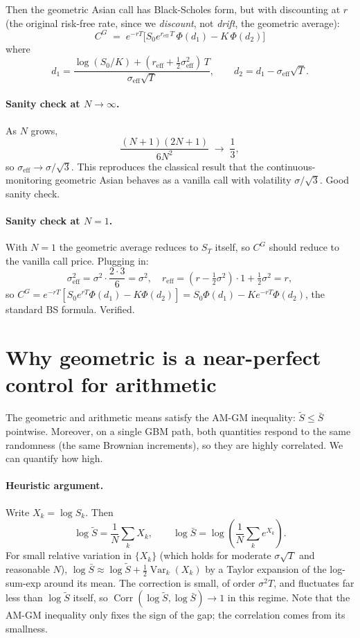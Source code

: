 \documentclass[11pt,a4paper]{article}
\theoremstyle{plain}
\theoremstyle{definition}
\theoremstyle{remark}
\newcommand{\Var}{\operatorname{Var}}
\newcommand{\Corr}{\operatorname{Corr}}
\begin{document}
Then the geometric Asian call has Black-Scholes form, but with
discounting at $r$ (the original risk-free rate, since we
\emph{discount}, not \emph{drift}, the geometric average):
\begin{equation}
\boxed{
C^G \;=\; e^{-rT}\bigl[ S_0 e^{r_{\mathrm{eff}}\,T}\,\Phi(d_1)
- K\,\Phi(d_2)\bigr]
}
\end{equation}
where
\begin{equation}
d_1 = \frac{\log(S_0/K) + (r_{\mathrm{eff}} + \tfrac{1}{2}\sigma_{\mathrm{eff}}^2)\,T}
{\sigma_{\mathrm{eff}}\sqrt T},
\qquad
d_2 = d_1 - \sigma_{\mathrm{eff}}\sqrt T.
\end{equation}

\paragraph{Sanity check at $N \to \infty$.} As $N$ grows,
\[
\frac{(N+1)(2N+1)}{6N^2} \;\to\; \frac{1}{3},
\]
so $\sigma_{\mathrm{eff}} \to \sigma/\sqrt 3$. This reproduces the
classical result that the continuous-monitoring geometric Asian
behaves as a vanilla call with volatility $\sigma/\sqrt 3$. Good
sanity check.

\paragraph{Sanity check at $N = 1$.} With $N = 1$ the geometric
average reduces to $S_T$ itself, so $C^G$ should reduce to the
vanilla call price. Plugging in:
\[
\sigma_{\mathrm{eff}}^2 = \sigma^2 \cdot \frac{2 \cdot 3}{6} = \sigma^2,
\quad
r_{\mathrm{eff}} = (r - \tfrac{1}{2}\sigma^2) \cdot 1 + \tfrac{1}{2}\sigma^2 = r,
\]
so $C^G = e^{-rT}[S_0 e^{rT}\Phi(d_1) - K\Phi(d_2)] = S_0\Phi(d_1) -
K e^{-rT}\Phi(d_2)$, the standard BS formula. Verified.

\section{Why geometric is a near-perfect control for arithmetic}
\label{sec:correlation}

The geometric and arithmetic means satisfy the AM-GM inequality:
$\tilde S \le \bar S$ pointwise. Moreover, on a single GBM path,
both quantities respond to the same randomness (the same Brownian
increments), so they are highly correlated. We can quantify how
high.

\paragraph{Heuristic argument.} Write $X_k = \log S_k$. Then
\[
\log \tilde S = \frac{1}{N}\sum_k X_k,
\qquad
\log \bar S = \log\!\left(\frac{1}{N}\sum_k e^{X_k}\right).
\]
For small relative variation in $\{X_k\}$ (which holds for
moderate $\sigma\sqrt T$ and reasonable $N$), $\log \bar S \approx
\log \tilde S + \tfrac{1}{2}\Var_k(X_k)$ by a Taylor expansion of
the log-sum-exp around its mean. The correction is small, of order
$\sigma^2 T$, and fluctuates far less than $\log \tilde S$ itself, so
$\Corr(\log \tilde S, \log \bar S) \to 1$ in this regime. Note that the
AM-GM inequality only fixes the sign of the gap; the correlation comes
from its smallness.
\end{document}
